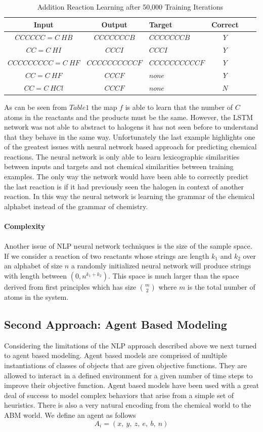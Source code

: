 \documentclass[aps,floatfix,prd,showpacs]{revtex4}
\begin{document}
\begin{table}[ht]
\caption{Addition Reaction Learning after 50,000 Training Iterations}
\label{Addition}
\begin{tabular}{cclccl}
\hline
Input & Output &  Target & Correct\\
\hline
\hline
$CCCCCC=C \ HB$ & $CCCCCCCB$ & $CCCCCCCB$ & $Y$ \\
$CC=C \ HI$ & $CCCI$ & $CCCI$& $Y$  \\
$CCCCCCCCC=C \ HF$ & $CCCCCCCCCCF$ & $CCCCCCCCCCF$& $Y$  \\
$CC=C \ HF$ & $CCCF$ & $none$& $Y$ \\
$CC=C \ HCl $ & $CCCF$ & $none$& $N$ \\

\hline
\hline
\end{tabular}
\end{table}
As can be seen from $Table 1$ the map $f$ is able to learn that the number of $C$ atoms in the reactants and the products must be the same. However, the LSTM network was not able to abstract to halogens it has not seen before to understand that they behave in the same way. Unfortunately the last example highlights one of the greatest issues with neural network based approach for predicting chemical reactions. The neural network is only able to learn lexicographic similarities between inputs and targets and not chemical  similarities between training examples. The only way the network would have been able to correctly predict the last reaction is if it had previously seen the halogen in context of another reaction. In this way the neural network is learning the grammar of the chemical alphabet instead of the grammar of chemistry.
\\
\\
\textbf{Complexity}
\\
\\
Another issue of NLP neural network techniques is the size of the sample space. If we consider a reaction of two reactants whose strings are length $k_1$ and $k_2$ over an alphabet of size $n$ a randomly initialized neural network will produce strings with length between $(0, n^{k_1 + k_2})$. This space is much larger than the space derived from first principles which has size $m \choose 2$ where $m$ is the total number of atoms in the system.

\subsection{Second Approach: Agent Based Modeling }
Considering the limitations of the NLP approach described above we next turned to agent based modeling. Agent based models are comprised of multiple instantiations of classes of objects that are given objective functions. They are allowed to interact in a defined environment for a given number of time steps to improve their objective function. Agent based models have been used with a great deal of success to model complex behaviors that arise from a simple set of heuristics. There is also a very natural encoding from the chemical world to the ABM world. We define an agent as follows
$$A_i = (x, \ y, \ z, \ e, \ b, \ n)$$
\end{document}
